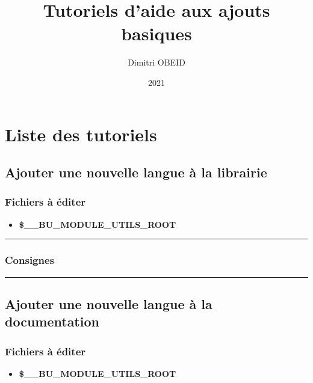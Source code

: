 \documentclass[a4paper,10pt]{article}
\title{\color{red}Tutoriels d'aide aux ajouts basiques}\color{white}
\author{Dimitri OBEID}
\date{2021}
\begin{document}
\maketitle
\newpage

\hypertarget{contents}{}
\tableofcontents
\newpage

\color{red}
\section{Liste des tutoriels}\color{white}

\color{green}
\subsection{Ajouter une nouvelle langue à la librairie}\color{white}

\color{blue}
\subsubsection{Fichiers à éditer}\color{white}
\begin{itemize}
    \item \textbf{\color{orange}\$\_\_BU\_MODULE\_UTILS\_ROOT\color{lime}}
\end{itemize}



\color{blue}\par\noindent\rule{\textwidth}{0.4pt}\color{white}

\color{blue}
\subsubsection{Consignes}\color{white}



\color{green}\par\noindent\rule{\textwidth}{0.4pt}\color{white}

\color{green}
\subsection{Ajouter une nouvelle langue à la documentation}\color{white}

\color{blue}
\subsubsection{Fichiers à éditer}\color{white}
\begin{itemize}
    \item \textbf{\color{orange}\$\_\_BU\_MODULE\_UTILS\_ROOT\color{lime}}
\end{itemize}
\end{document}
